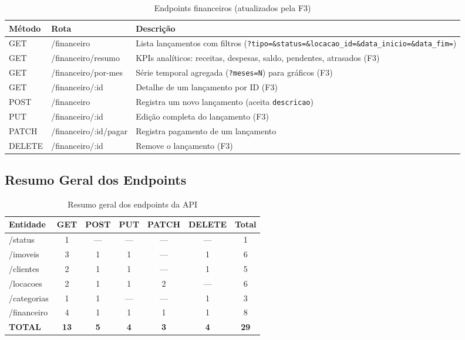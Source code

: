 \documentclass[12pt, a4paper]{article}
\newcommand{\thead}[1]{\cellcolor{tableheader}\color{white}\bfseries #1}
\newcommand{\talt}{\rowcolor{tablerowalt}}
\begin{document}
\begin{table}[H]
\centering
\begin{tabularx}{\textwidth}{|l|l|X|}
\hline
\thead{Método} & \thead{Rota} & \thead{Descrição} \\
\hline
GET    & /financeiro            & Lista lançamentos com filtros (\texttt{?tipo=\&status=\&locacao\_id=\&data\_inicio=\&data\_fim=}) \\
\talt GET    & /financeiro/resumo     & KPIs analíticos: receitas, despesas, saldo, pendentes, atrasados (F3) \\
GET    & /financeiro/por-mes    & Série temporal agregada (\texttt{?meses=N}) para gráficos (F3) \\
\talt GET    & /financeiro/:id        & Detalhe de um lançamento por ID (F3) \\
POST   & /financeiro            & Registra um novo lançamento (aceita \texttt{descricao}) \\
\talt PUT    & /financeiro/:id        & Edição completa do lançamento (F3) \\
PATCH  & /financeiro/:id/pagar  & Registra pagamento de um lançamento \\
\talt DELETE & /financeiro/:id        & Remove o lançamento (F3) \\
\hline
\end{tabularx}
\caption{Endpoints financeiros (atualizados pela F3)}
\end{table}

\subsection{Resumo Geral dos Endpoints}

\begin{table}[H]
\centering
\begin{tabular}{|l|c|c|c|c|c|c|}
\hline
\thead{Entidade} & \thead{GET} & \thead{POST} & \thead{PUT} & \thead{PATCH} & \thead{DELETE} & \thead{Total} \\
\hline
/status      & 1  & —  & —  & —  & —  & 1  \\
\talt /imoveis     & 3  & 1  & 1  & —  & 1  & 6  \\
/clientes    & 2  & 1  & 1  & —  & 1  & 5  \\
\talt /locacoes    & 2  & 1  & 1  & 2  & —  & 6  \\
/categorias  & 1  & 1  & —  & —  & 1  & 3  \\
\talt /financeiro  & 4  & 1  & 1  & 1  & 1  & 8  \\
\hline
\textbf{TOTAL} & \textbf{13} & \textbf{5} & \textbf{4} & \textbf{3} & \textbf{4} & \textbf{29} \\
\hline
\end{tabular}
\caption{Resumo geral dos endpoints da API}
\end{table}
\end{document}
